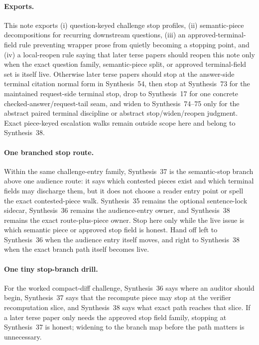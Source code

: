 \documentclass[11pt]{article}
\begin{document}
\paragraph{Exports.}
This note exports (i) question-keyed challenge stop profiles, (ii) semantic-piece decompositions for recurring downstream questions, (iii) an approved-terminal-field rule preventing wrapper prose from quietly becoming a stopping point, and (iv) a local-reopen rule saying that later terse papers should reopen this note only when the exact question family, semantic-piece split, or approved terminal-field set is itself live. Otherwise later terse papers should stop at the answer-side terminal citation normal form in Synthesis~54, then stop at Synthesis~73 for the maintained request-side terminal stop, drop to Synthesis~17 for one concrete checked-answer/request-tail seam, and widen to Synthesis~74--75 only for the abstract paired terminal discipline or abstract stop/widen/reopen judgment. Exact piece-keyed escalation walks remain outside scope here and belong to Synthesis~38.\cite{series:challengebranches,series:challengeanswerreviewmenus,series:publicrequestresponsepacketrefreshresponsepacketclosureverdicts,series:pairedterminalcitationdiscipline,series:pairedterminalcutoverrules,series:workedexample}

\paragraph{One branched stop route.}
Within the same challenge-entry family, Synthesis~37 is the semantic-stop branch above one audience route: it says which contested pieces exist and which terminal fields may discharge them, but it does not choose a reader entry point or spell the exact contested-piece walk. Synthesis~35 remains the optional sentence-lock sidecar, Synthesis~36 remains the audience-entry owner, and Synthesis~38 remains the exact route-plus-piece owner. Stop here only while the live issue is which semantic piece or approved stop field is honest. Hand off left to Synthesis~36 when the audience entry itself moves, and right to Synthesis~38 when the exact branch path itself becomes live.\cite{series:challengeroutes,series:challengebranches}

\paragraph{One tiny stop-branch drill.}
For the worked compact-diff challenge, Synthesis~36 says where an auditor should begin, Synthesis~37 says that the recompute piece may stop at the verifier recomputation slice, and Synthesis~38 says what exact path reaches that slice. If a later terse paper only needs the approved stop field family, stopping at Synthesis~37 is honest; widening to the branch map before the path matters is unnecessary.\cite{series:challengeroutes,series:challengebranches,series:workedexample}
\end{document}
